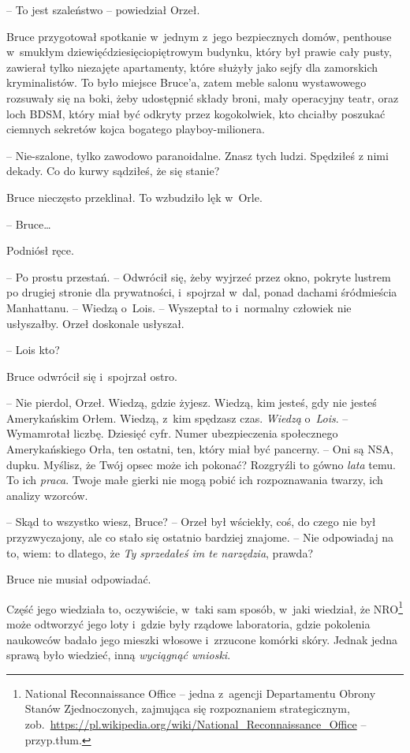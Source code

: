 \documentclass[oneside,polish,11pt,sfheadings]{mwbk}
\begin{document}
-- To jest szaleństwo -- powiedział Orzeł. 

Bruce przygotował spotkanie w~jednym z~jego bezpiecznych domów, penthouse w~smukłym
dziewięćdziesięciopiętrowym budynku, który był prawie cały pusty,
zawierał tylko niezajęte apartamenty, które służyły jako sejfy dla
zamorskich kryminalistów. To było miejsce Bruce'a, zatem meble salonu
wystawowego rozsuwały się na boki, żeby udostępnić składy broni, mały
operacyjny teatr, oraz loch BDSM, który miał być odkryty przez
kogokolwiek, kto chciałby poszukać ciemnych sekretów kojca bogatego
playboy-milionera.

-- Nie-szalone, tylko zawodowo paranoidalne. Znasz tych ludzi. Spędziłeś
z nimi dekady. Co do kurwy sądziłeś, że się stanie?

Bruce nieczęsto przeklinał. To wzbudziło lęk w~Orle.

-- Bruce\ldots 

Podniósł ręce. 

-- Po prostu przestań. -- Odwrócił się, żeby wyjrzeć przez
okno, pokryte lustrem po drugiej stronie dla prywatności, i~spojrzał w~dal, ponad dachami śródmieścia Manhattanu. -- Wiedzą o~Lois. -- Wyszeptał
to i~normalny człowiek nie usłyszałby. Orzeł doskonale usłyszał.

-- Lois kto?

Bruce odwrócił się i~spojrzał ostro. 

-- Nie pierdol, Orzeł. Wiedzą, gdzie
żyjesz. Wiedzą, kim jesteś, gdy nie jesteś Amerykańskim Orłem. Wiedzą, z~kim spędzasz czas. \textit{Wiedzą} o~\textit{Lois}. -- Wymamrotał liczbę.
Dziesięć cyfr. Numer ubezpieczenia społecznego Amerykańskiego Orła, ten
ostatni, ten, który miał być pancerny. -- Oni są NSA, dupku. Myślisz, że
Twój opsec może ich pokonać? Rozgryźli to gówno \textit{lata} temu. To ich
\textit{praca}. Twoje małe gierki nie mogą pobić ich rozpoznawania twarzy,
ich analizy wzorców.

-- Skąd to wszystko wiesz, Bruce? -- Orzeł był wściekły, coś, do czego nie
był przyzwyczajony, ale co stało się ostatnio bardziej znajome. -- Nie
odpowiadaj na to, wiem: to dlatego, że \textit{Ty sprzedałeś im te
narzędzia}, prawda?

Bruce nie musiał odpowiadać.

Część jego wiedziała to, oczywiście, w~taki sam sposób, w~jaki wiedział,
że NRO\footnote{ National Reconnaissance Office -- jedna z~agencji Departamentu
Obrony Stanów Zjednoczonych, zajmująca się rozpoznaniem strategicznym,
zob.~\url{https://pl.wikipedia.org/wiki/National\_Reconnaissance\_Office}
-- przyp.tłum.} może odtworzyć jego loty i~gdzie były rządowe
laboratoria, gdzie pokolenia naukowców badało jego mieszki włosowe i~zrzucone komórki skóry. Jednak jedna sprawą było wiedzieć, inną
\textit{wyciągnąć wnioski}.
\end{document}
